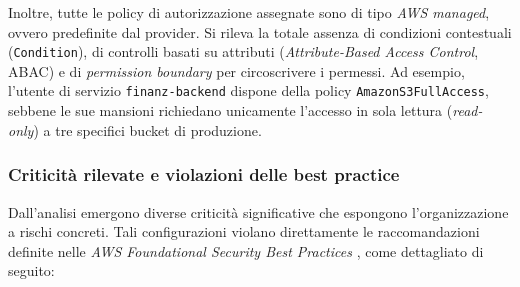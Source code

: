 Inoltre, tutte le policy di autorizzazione assegnate sono di tipo \emph{AWS managed}, ovvero predefinite dal provider. Si rileva la totale assenza di condizioni contestuali (\texttt{Condition}), di controlli basati su attributi (\emph{Attribute-Based Access Control}, ABAC) e di \emph{permission boundary} per circoscrivere i permessi. Ad esempio, l'utente di servizio \texttt{finanz-backend} dispone della policy \texttt{AmazonS3FullAccess}, sebbene le sue mansioni richiedano unicamente l'accesso in sola lettura (\emph{read-only}) a tre specifici bucket di produzione.

\subsubsection*{Criticità rilevate e violazioni delle best practice}
Dall'analisi emergono diverse criticità significative che espongono l'organizzazione a rischi concreti. Tali configurazioni violano direttamente le raccomandazioni definite nelle \emph{AWS Foundational Security Best Practices} \cite{aws_security_foundational}, come dettagliato di seguito:


